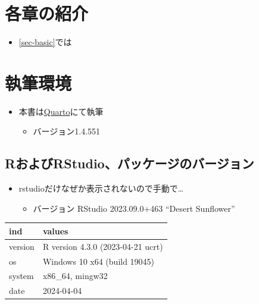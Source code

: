 \documentclass[
  b5paper,
  xelatex, ja=standard]{bxjsbook}
\providecommand{\tightlist}{%
  \setlength{\itemsep}{0pt}\setlength{\parskip}{0pt}}\usepackage{longtable,booktabs,array}
\begin{document}
\section*{各章の紹介}\label{ux5404ux7ae0ux306eux7d39ux4ecb}


\begin{itemize}
\tightlist
\item
  \ref{sec-basic}では
\end{itemize}

\section*{執筆環境}\label{ux57f7ux7b46ux74b0ux5883}


\begin{itemize}
\tightlist
\item
  本書は\href{https://quarto.org/}{Quarto}にて執筆

  \begin{itemize}
  \tightlist
  \item
    バージョン1.4.551
  \end{itemize}
\end{itemize}

\subsection*{RおよびRStudio、パッケージのバージョン}\label{rux304aux3088ux3073rstudioux30d1ux30c3ux30b1ux30fcux30b8ux306eux30d0ux30fcux30b8ux30e7ux30f3}

\begin{itemize}
\tightlist
\item
  rstudioだけなぜか表示されないので手動で\ldots{}

  \begin{itemize}
  \tightlist
  \item
    バージョン RStudio 2023.09.0+463 ``Desert Sunflower''
  \end{itemize}
\end{itemize}

\begin{table}
\centering
\begin{tabular}{l|l}
\hline
ind & values\\
\hline
version & R version 4.3.0 (2023-04-21 ucrt)\\
\hline
os & Windows 10 x64 (build 19045)\\
\hline
system & x86\_64, mingw32\\
\hline
date & 2024-04-04\\
\hline
\end{tabular}
\end{table}
\end{document}
